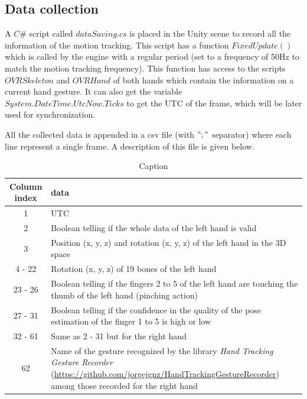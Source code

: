\documentclass{article}
\begin{document}
\subsection{Data collection}

A $C\#$ script called $dataSaving.cs$ is placed in the Unity scene to record all the information of the motion tracking. This script has a function $FixedUpdate()$ which is called by the engine with a regular period (set to a frequency of 50Hz to match the motion tracking frequency). This function has access to the scripts $OVRSkeleton$ and $OVRHand$ of both hands which contain the information on a current hand gesture. It can also get the variable $System.DateTime.UtcNow.Ticks$ to get the UTC of the frame, which will be later used for synchronization.

All the collected data is appended in a csv file (with $";"$ separator) where each line represent a single frame. A description of this file is given below.

\begin{table}[H]
    \centering
    \begin{tabular}{|c|p{12cm}|}
        \hline
        Column index & data \\
        \hline
        1 & UTC \\ \hline
        2 & Boolean telling if the whole data of the left hand is valid \\ \hline
        3 & Position (x, y, z) and rotation (x, y, z) of the left hand in the 3D space \\ \hline
        4 - 22 & Rotation (x, y, z) of 19 bones of the left hand \\ \hline
        23 - 26 & Boolean telling if the fingers 2 to 5 of the left hand are touching the thumb of the left hand (pinching action) \\ \hline
        27 - 31 & Boolean telling if the confidence in the quality of the pose estimation of the finger 1 to 5 is high or low \\ \hline
        32 - 61 & Same as 2 - 31 but for the right hand \\ \hline
        62 & Name of the gesture recognized by the library \textit{Hand Tracking Gesture  Recorder} (\url{https://github.com/jorgejgnz/HandTrackingGestureRecorder}) among those recorded for the right hand\\
        \hline
    \end{tabular}
    \caption{Caption}
    \label{tab:my_label}
\end{table}
\end{document}
